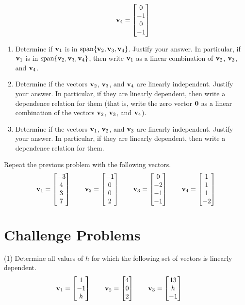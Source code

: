 \begin{tasks}[resume, style=enumerate]
\begin{displaymath}
    \qquad
    \mathbf v_4 =  \begin{bmatrix} 0 \\ -1 \\ 0 \\ -1 \end{bmatrix} 
  \end{displaymath}
  \begin{enumerate}[label=(\alph*)]
  \item
    Determine if $\mathbf v_1$ is in $\operatorname{\mathrm{span}}\{\mathbf v_2, \mathbf v_3, \mathbf v_4\}$.
    Justify your answer.  In particular, if $\mathbf v_1$ is in
    $\operatorname{\mathrm{span}}\{\mathbf v_2, \mathbf v_3, \mathbf v_4\}$, then write $\mathbf v_1$ as a linear
    combination of $\mathbf v_2$, $\mathbf v_3$, and $\mathbf v_4$.
  \item
    Determine if the vectors $\mathbf v_2$, $\mathbf v_3$, and $\mathbf v_4$ are
    linearly independent.  Justify your answer.  In particular, if
    they are linearly dependent, then write a dependence relation for
    them (that is, write the zero vector $\mathbf 0$ as a linear
    combination of the vectors $\mathbf v_2$, $\mathbf v_3$, and $\mathbf v_4$).
  \item
    Determine if the vectors $\mathbf v_1$, $\mathbf v_2$, and $\mathbf v_3$ are
    linearly independent.  Justify your answer.  In particular, if
    they are linearly dependent, then write a dependence relation for
    them.
  \end{enumerate}
\task
  Repeat the previous problem with the following vectors.
  \begin{displaymath}
    \mathbf v_1 =  \begin{bmatrix} -3 \\ 4 \\ 3 \\ 7 \end{bmatrix} 
    \qquad
    \mathbf v_2 =  \begin{bmatrix} -1 \\ 0 \\ 0 \\ 2 \end{bmatrix} 
    \qquad
    \mathbf v_3 =  \begin{bmatrix} 0 \\ -2 \\ -1 \\ -1 \end{bmatrix} 
    \qquad
    \mathbf v_4 =  \begin{bmatrix} 1 \\ 1 \\ 1 \\ -2 \end{bmatrix} 
  \end{displaymath}
\end{tasks}

\section{Challenge Problems}

\begin{tasks}[resume, style=enumerate](1)
\task
  Determine all values of $h$ for which the following set of vectors
  is linearly dependent.
  \begin{align*}
    \mathbf v_1 =
    \begin{bmatrix} 1 \\ -1 \\ h \end{bmatrix}
    \qquad
    \mathbf v_2 =
    \begin{bmatrix} 4 \\ 0 \\ 2 \end{bmatrix}
    \qquad
    \mathbf v_3 =
    \begin{bmatrix} 13 \\ h \\ -1 \end{bmatrix}
    \qquad
  \end{align*}
\end{tasks}
